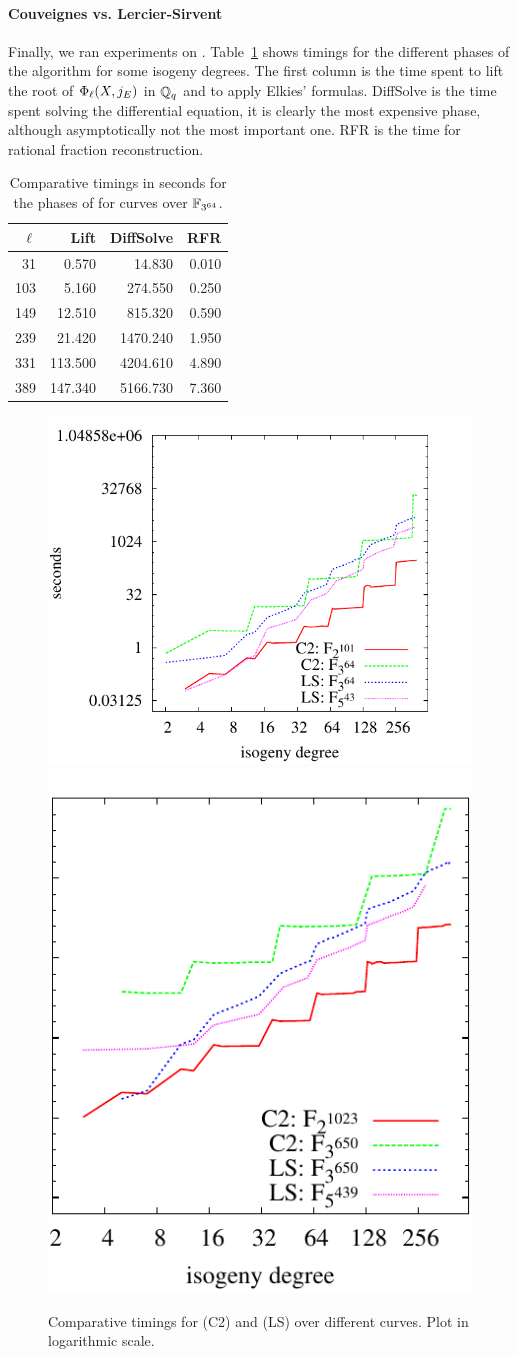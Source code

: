 \paragraph{Couveignes vs. Lercier-Sirvent}
Finally, we ran experiments on .
Table~\ref{tab:ls} shows timings for the different phases of the
algorithm for some isogeny degrees. The first column is the time spent
to lift the root of $\Phi_\ell(X,j_E)$ in $\mathbb{Q}_q$ and to apply
Elkies' formulas. DiffSolve is the time spent solving the differential
equation, it is clearly the most expensive phase, although
asymptotically not the most important one. RFR is the time for
rational fraction reconstruction.

\begin{table}
  \centering
  \begin{tabular}{r r r r}
    \hline
    $\ell$ & Lift & DiffSolve & RFR\\
    \hline
    31  &   0.570 &   14.830 & 0.010\\
    103 &   5.160 &  274.550 & 0.250\\
    149 &  12.510 &  815.320 & 0.590\\
    239 &  21.420 & 1470.240 & 1.950\\
    331 & 113.500 & 4204.610 & 4.890\\
    389 & 147.340 & 5166.730 & 7.360\\
  \end{tabular}
  \caption{Comparative timings in seconds for the phases of  
    for curves over $\mathbb{F}_{3^{64}}$.}
  \label{tab:ls}
\end{table}


\begin{figure}
  \centering
  \includegraphics[height=0.45\textwidth]{isogeny/C2-LS}
  \includegraphics[height=0.45\textwidth]{isogeny/C2-LS2}
  \caption{Comparative timings for \ctwoasfimc{} (C2) and
     (LS) over different curves. Plot in
    logarithmic scale.}
  \label{fig:comp}
\end{figure}

